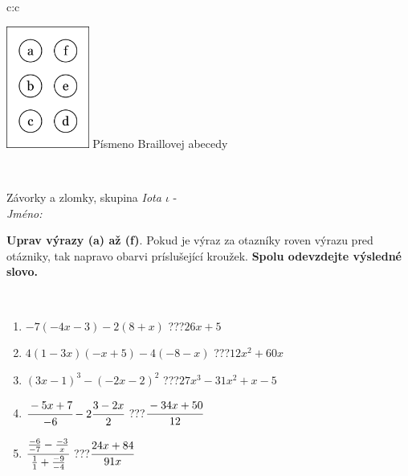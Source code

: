 \documentclass[10pt]{report}
\begin{document}
\begin{tabular}{c:c}
\begin{minipage}[c][104.5mm][t]{0.5\linewidth}
\begin{center}
\begin{minipage}{0.20\linewidth}
\begin{center}
\includegraphics[height=40mm]{../images/braille.png}
{\small Písmeno Braillovej abecedy}
\end{center}
\end{minipage}
\end{center}
\end{minipage}
\\ \hdashline
\begin{minipage}[c][104.5mm][t]{0.5\linewidth}
\begin{center}
\vspace{7mm}
{\huge Závorky a zlomky, skupina \textit{Iota $\iota$} -}\\[5mm]
\textit{Jméno:}\phantom{xxxxxxxxxxxxxxxxxxxxxxxxxxxxxxxxxxxxxxxxxxxxxxxxxxxxxxxxxxxxxxxxx}\\[5mm]
\begin{minipage}{0.95\linewidth}
\begin{center}
\textbf{Uprav výrazy (a) až (f)}. Pokud je výraz za otazníky roven výrazu pred otázniky, tak napravo obarvi príslušející kroužek. \textbf{Spolu odevzdejte výsledné slovo.}
\end{center}
\end{minipage}
\\[1mm]
\begin{minipage}{0.79\linewidth}
\begin{center}
\begin{varwidth}{\linewidth}
\begin{enumerate}
\normalsize
\item $-7(-4x-3)-2(8+x)$\quad \dotfill\; ???\;\dotfill \quad $26x+5$
\item $4(1-3x)(-x+5)-4(-8-x)$\quad \dotfill\; ???\;\dotfill \quad $12x^2+60x$
\item $(3x-1)^3-(-2x-2)^2$\quad \dotfill\; ???\;\dotfill \quad $27x^3-31x^2+x-5$
\item $\cfrac{-5x+7}{-6}-2\cfrac{3-2x}{2}$\quad \dotfill\; ???\;\dotfill \quad $\cfrac{-34x+50}{12}$
\item $\cfrac{\frac{-6}{-7}-\frac{-3}{x}}{\frac{1}{1}+\frac{-9}{-4}}$\quad \dotfill\; ???\;\dotfill \quad $\cfrac{24x+84}{91x}$

\end{enumerate}
\end{varwidth}
\end{center}
\end{minipage}
\end{center}
\end{minipage}
\end{tabular}
\end{document}
